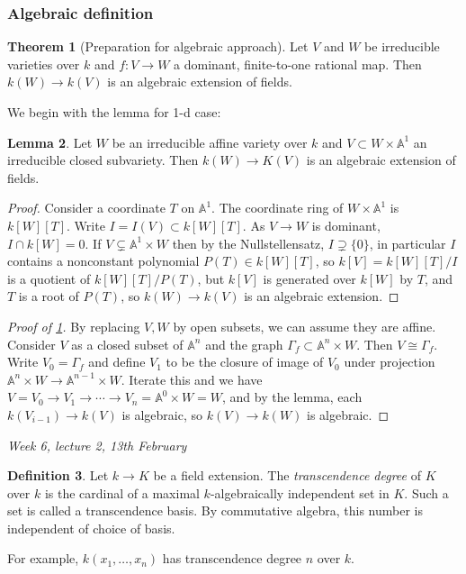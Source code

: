 \documentclass{article}
\newcommand{\A}{\mathbb{A}}
\theoremstyle{definition}
\newtheorem{defn}{Definition}[subsection]
\newtheorem{thm}[defn]{Theorem}
\newtheorem{lemma}[defn]{Lemma}
\begin{document}
\subsubsection{Algebraic definition}
\begin{thm}[Preparation for algebraic approach]
\label{thm:algdim}
Let $V$ and $W$ be irreducible varieties over $k$ and $f:V\rightarrow W$ a dominant, finite-to-one rational map. Then $k(W)\rightarrow k(V)$ is an algebraic extension of fields.
\end{thm}
We begin with the lemma for 1-d case:
\begin{lemma}
Let $W$ be an irreducible affine variety over $k$ and $V\subset W\times\A^1$ an irreducible closed subvariety. Then $k(W)\rightarrow K(V)$ is an algebraic extension of fields.
\end{lemma}
\begin{proof}
Consider a coordinate $T$ on $\A^1$. The coordinate ring of $W\times\A^1$ is $k[W][T]$. Write $I=I(V)\subset k[W][T]$. As $V\rightarrow W$ is dominant, $I\cap k[W]=0$. If $V\subsetneq\A^1\times W$ then by the Nullstellensatz, $I\supsetneq\{0\}$, in particular $I$ contains a nonconstant polynomial $P(T)\in k[W][T]$, so $k[V]=k[W][T]/I$ is a quotient of $k[W][T]/P(T)$, but $k[V]$ is generated over $k[W]$ by $T$, and $T$ is a root of $P(T)$, so $k(W)\rightarrow k(V)$ is an algebraic extension.
\end{proof}

\begin{proof}[Proof of \ref{thm:algdim}]
By replacing $V,W$ by open subsets, we can assume they are affine. Consider $V$ as a closed subset of $\A^n$ and the graph $\Gamma_f\subset\A^n\times W$. Then $V\cong\Gamma_f$. Write $V_0=\Gamma_f$ and define $V_1$ to be the closure of image of $V_0$ under projection $\A^n\times W\rightarrow\A^{n-1}\times W$. Iterate this and we have $V=V_0\rightarrow V_1\rightarrow\cdots\rightarrow V_n=\A^0\times W=W$, and by the lemma, each $k(V_{i-1})\rightarrow k(V)$ is algebraic, so $k(V)\rightarrow k(W)$ is algebraic.
\end{proof}

\begin{flushright}
\textit{Week 6, lecture 2, 13th February}
\end{flushright}

\begin{defn}
Let $k\rightarrow K$ be a field extension. The \textit{transcendence degree} of $K$ over $k$ is the cardinal of a maximal $k$-algebraically independent set in $K$. Such a set is called a transcendence basis. By commutative algebra, this number is independent of choice of basis.
\end{defn}
For example, $k(x_1,\ldots,x_n)$ has transcendence degree $n$ over $k$.
\end{document}
